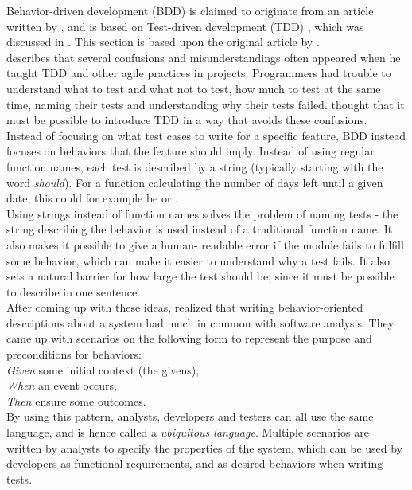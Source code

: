Behavior-driven development (BDD) is claimed to originate from an
article written by \citet{web:dan_north}, and is based on Test-driven
development (TDD) \cite{wiki:bdd}, which was discussed in
. This section is based upon the original article by
\citet{web:dan_north}.\\

\citeauthor{web:dan_north} describes that several confusions and
misunderstandings often appeared when he taught TDD and other agile
practices in projects. Programmers had trouble to understand what to
test and what not to test, how much to test at the same time, naming
their tests and understanding why their tests failed.
\citeauthor{web:dan_north} thought that it must be possible to introduce
TDD in a way that avoids these confusions.\\

Instead of focusing on what test cases to write for a specific feature,
BDD instead focuses on behaviors that the feature should imply. Instead
of using regular function names, each test is described by a string
(typically starting with the word \emph{should}). For a function
calculating the number of days left until a given date, this could for
example be  or
.\\

Using strings instead of function names solves the problem of naming
tests - the string describing the behavior is used instead of a
traditional function name. It also makes it possible to give a human-
readable error if the module fails to fulfill some behavior, which can
make it easier to understand why a test fails. It also sets a natural
barrier for how large the test should be, since it must be possible to
describe in one sentence.\\

After coming up with these ideas, \citeauthor{web:dan_north} realized
that writing behavior-oriented descriptions about a system had much in
common with software analysis. They came up with scenarios on the
following form to represent the purpose and preconditions for
behaviors:\\

\emph{Given} some initial context (the givens),\\
\emph{When} an event occurs,\\
\emph{Then} ensure some outcomes.\\

By using this pattern, analysts, developers and testers can all use the
same language, and is hence called a \emph{ubiquitous language}. Multiple
scenarios are written by analysts to specify the properties of the
system, which can be used by developers as functional requirements, and
as desired behaviors when writing tests.\\
